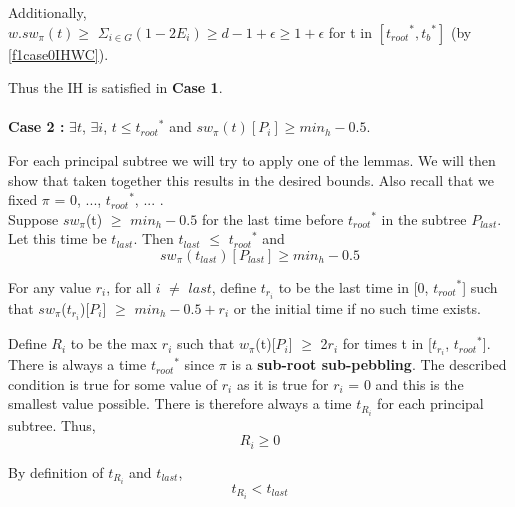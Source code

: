 \documentclass[12pt]{article}
\newcommand{\troots}{{t_{root}}^*}
\newcommand{\tbs}{{t_b}^{*}}
\begin{document}
Additionally, \\$w.sw_\pi(t) \geq$ $\Sigma_{i \in G} (1 - 2E_i) \geq d - 1 + \epsilon \geq 1 + \epsilon$ for t in $[\troots, \tbs]$ (by \ref{f1case0IHWC}). 

Thus the IH is satisfied in {\bf Case 1}.\\\\










\noindent
{\bf Case 2 :}  $\exists t$, $\exists i$, $t \le \troots$ and $sw_{\pi}(t)[P_i] \geq min_h-0.5$.

For each principal subtree we will try to apply one of the lemmas. We will then show that taken together this results in the desired bounds. Also recall that we fixed $\pi$ = 0, ..., $\troots$, ... .\\

Suppose $sw_{\pi}$(t) $\geq$ $min_h-0.5$ for the last time before $\troots$ in the subtree $P_{last}$. Let this time be $t_{last}$. Then $t_{last}$ $\leq$ $\troots$ and 
\begin{equation} sw_{\pi}(t_{last})[P_{last}] \geq min_h-0.5\label{swp2tlast}\end{equation}

For any value $r_i$, for all $i$ $\ne$ $last$, define $t_{r_i}$ to be the last time in [0, $\troots$] such that  $sw_{\pi}$($t_{r_i}$)[$P_i$]  $\geq$ $min_h-0.5+r_i$ or the initial time if no such time exists.

Define $R_i$ to be the max $r_i$ such that $w_{\pi}$(t)[$P_i$] $\geq$ 2${r_i}$ for times t in [$t_{r_i}$, $\troots$].\\


There is always a time $\troots$ since $\pi$ is a {\bf sub-root sub-pebbling}. The described condition is true for some value of $r_i$ as it is true for $r_i$ = 0 and this is the smallest value possible. There is therefore always a time $t_{R_i}$ for each principal subtree. Thus,
\begin{equation} {R_i} \geq 0\label{DboundsC1A}\end{equation}

By definition of $t_{R_i}$ and $t_{last}$, 
\begin{equation} t_{R_i} < t_{last}\label{tdtlast}\end{equation}

\end{document}
